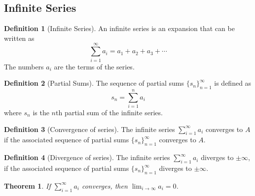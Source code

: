 \documentclass{article}
\theoremstyle{plain}
\newtheorem{theorem}{Theorem}[section]
\numberwithin{theorem}{subsection}
\theoremstyle{definition}
\newtheorem{definition}{Definition}[section]
\numberwithin{definition}{subsection}
\theoremstyle{remark}
\numberwithin{note}{subsection}
\begin{document}
\subsection{Infinite Series}
\begin{multicols}{2}
    \begin{definition}[Infinite Series]
        An infinite series is an expansion that can be written as
        \begin{equation*}
            \sum_{i=1}^\infty a_i = a_1 + a_2 + a_3 + \cdots
        \end{equation*}
        The numbers $a_i$ are the terms of the series.
    \end{definition}
    \begin{definition}[Partial Sums]
        The sequence of partial sums $\{s_n\}_{n=1}^\infty$ is defined as
        \begin{equation*}
            s_n = \sum_{i=1}^n a_i
        \end{equation*}
        where $s_n$ is the $n$th partial sum of the infinite series.
    \end{definition}
    \columnbreak
    \begin{definition}[Convergence of series]
        The infinite series $\sum_{i=1}^\infty a_i$ converges to $A$ if the associated sequence of partial sums $\{s_n\}_{n=1}^\infty$ converges to $A$.
    \end{definition}
    \begin{definition}[Divergence of series]
        The infinite series $\sum_{i=1}^\infty a_i$ diverges to $\pm\infty$, if the associated sequence of partial sums $\{s_n\}_{n=1}^\infty$ diverges to $\pm\infty$.
    \end{definition}
    \begin{theorem}
        If $\sum_{i=1}^{\infty}a_i$ converges, then $\lim_{i\to\infty}a_i=0$.
    \end{theorem}
\end{multicols}
%
\end{document}
